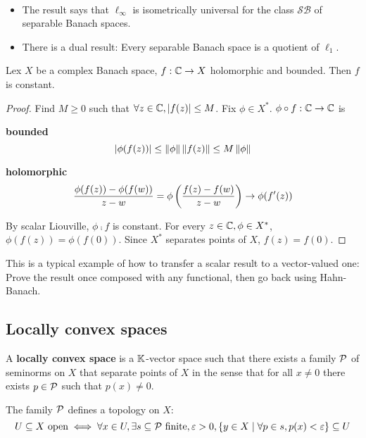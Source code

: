 \documentclass{article}
\begin{document}
\newlec

\begin{rmks}~
  \begin{itemize}
    \item The result says that $\ell_\infty$ is isometrically universal for the class $\mathcal{SB}$ of separable Banach spaces.
    \item There is a dual result: Every separable Banach space is a quotient of $\ell_1$.
  \end{itemize}
\end{rmks}

\begin{nthm}
  Lex $X$ be a complex Banach space, $f : \mathbb C \rightarrow X$ holomorphic and bounded. Then $f$ is constant.
\end{nthm}
\begin{proof}
  Find $M \ge 0$ such that $\forall z \in \mathbb C, \left\lvert f(z)\right\rvert \le M$. Fix $\phi \in X^*$. $\phi \circ f : \mathbb C \rightarrow \mathbb C$ is

  {\bf bounded}
  $$\left\lvert \phi(f(z))\right\rvert \le \left\lVert \phi\right\rVert \left\lVert f(z)\right\rVert \le M\left\lVert \phi\right\rVert$$

  {\bf holomorphic}
  $$\frac{\phi(f(z)) - \phi(f(w))}{z - w} = \phi\left(\frac{f(z) - f(w)}{z - w}\right) \rightarrow \phi(f'(z))$$

  By scalar Liouville, $\phi \comp f$ is constant. For every $z \in \mathbb C, \phi \in X^*$, $\phi(f(z)) = \phi(f(0))$. Since $X^*$ separates points of $X$, $f(z) = f(0)$.
\end{proof}

\begin{rmk}
  This is a typical example of how to transfer a scalar result to a vector-valued one: Prove the result once composed with any functional, then go back using Hahn-Banach.
\end{rmk}

\subsection{Locally convex spaces}

\begin{defi}
  A {\bf locally convex space} is a $\mathbb K$-vector space such that there exists a family $\mathcal P$ of seminorms on $X$ that separate points of $X$ in the sense that for all $x \ne 0$ there exists $p \in \mathcal P$ such that $p(x) \ne 0$.
\end{defi}

The family $\mathcal P$ defines a topology on $X$:
$$U \subseteq X \text{ open} \iff \forall x \in U, \exists s \subseteq \mathcal P \text{ finite}, \varepsilon > 0, \{y \in X \mid \forall p \in s, p(x) < \varepsilon\} \subseteq U$$
\end{document}
